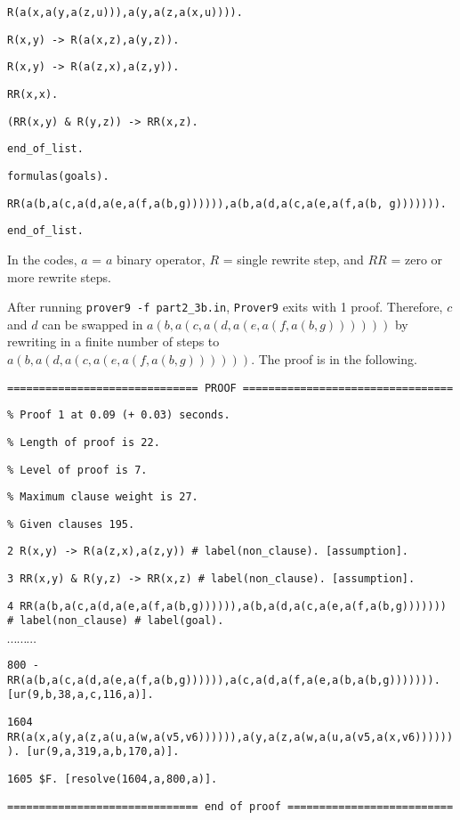 \begin{description}
{{\tt R(a(x,a(y,a(z,u))),a(y,a(z,a(x,u)))).}

{\tt R(x,y) -> R(a(x,z),a(y,z)).}

{\tt R(x,y) -> R(a(z,x),a(z,y)).}

{\tt RR(x,x). }

{\tt (RR(x,y) \& R(y,z)) -> RR(x,z). }

{\tt end\_of\_list.}

{\tt formulas(goals).}

{\tt RR(a(b,a(c,a(d,a(e,a(f,a(b,g)))))),a(b,a(d,a(c,a(e,a(f,a(b, g))))))).}

{\tt end\_of\_list.  }

}

\vspace{3mm}

In the codes, $a$ = $a$ binary operator, $R$ = single rewrite step, and $RR$ = zero or more rewrite steps.

  After running {\tt prover9 -f  part2\_3b.in}, {\tt Prover9} exits with 1 proof. Therefore, $c$ and $d$ can be swapped in $a(b, a(c, a(d, a(e, a(f, a(b, g))))))$ by rewriting in a finite number of steps to $a(b, a(d, a(c, a(e, a(f, a(b, g))))))$. The proof is in the following.

\vspace{3mm}

{\footnotesize

{\tt ============================== PROOF =================================}

{\tt \% Proof 1 at 0.09 (+ 0.03) seconds.}

{\tt \% Length of proof is 22.}

{\tt \% Level of proof is 7.}

{\tt \% Maximum clause weight is 27.}

{\tt \% Given clauses 195.}

{\tt 2 R(x,y) -> R(a(z,x),a(z,y)) \# label(non\_clause).  [assumption].}

{\tt 3 RR(x,y) \& R(y,z) -> RR(x,z) \# label(non\_clause).  [assumption].}

{\tt 4 RR(a(b,a(c,a(d,a(e,a(f,a(b,g)))))),a(b,a(d,a(c,a(e,a(f,a(b,g))))))) \#
label(non\_clause) \# label(goal).}

$\cdots \cdots \cdots$

{\tt 800 -RR(a(b,a(c,a(d,a(e,a(f,a(b,g)))))),a(c,a(d,a(f,a(e,a(b,a(b,g))))))).  [ur(9,b,38,a,c,116,a)].}

{\tt 1604 RR(a(x,a(y,a(z,a(u,a(w,a(v5,v6)))))),a(y,a(z,a(w,a(u,a(v5,a(x,v6))))))).  [ur(9,a,319,a,b,170,a)].}

{\tt 1605 \$F.  [resolve(1604,a,800,a)].}

{\tt ============================== end of proof ==========================}

}

\vspace{3mm}

\end{description}

